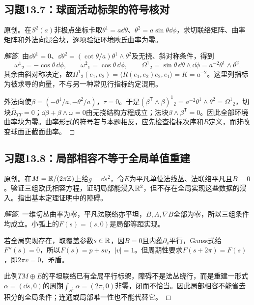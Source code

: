 \subsection*{习题13.7：球面活动标架的符号核对}
原创。在$S^2(a)$非极点坐标卡取$\theta^1=a\dd\theta$、$\theta^2=a\sin\theta\dd\phi$，求切联络矩阵、曲率矩阵和外法向混合块，逐项验证环境欧氏曲率为零。
\begin{proof}[解答]
由$\dd\theta^1=0$、$\dd\theta^2=(\cot\theta/a)\theta^1\wedge\theta^2$及无挠、斜对称条件，得到
\[
 \omega^1{}_2=-\cos\theta\,\dd\phi,\qquad
 \omega^2{}_1=\cos\theta\,\dd\phi,\qquad
 \Omega^1{}_2=\sin\theta\,\dd\theta\wedge\dd\phi
             =a^{-2}\theta^1\wedge\theta^2.
\]
其余由斜对称决定，故$\Omega^1{}_2(e_1,e_2)=\langle R(e_1,e_2)e_2,e_1\rangle=K=a^{-2}$。这里列指标为被求导的向量，不与另一种常见行指标约定混用。

外法向使$\beta=(-\theta^1/a,-\theta^2/a)$，$\tau=0$。于是$(\beta^{\mathsf T}\wedge\beta)^1{}_2=a^{-2}\theta^1\wedge\theta^2=\Omega^1{}_2$，切块$\bar\Omega_{TT}=0$；$\dd\beta+\beta\wedge\omega=0$由无挠结构方程成立；法块$\beta\wedge\beta^{\mathsf T}=0$。因此全部环境曲率块为零。曲率形式的符号若与本题相反，应先检查指标次序和$R$定义，而非改变球面正截面曲率。
\end{proof}

\subsection*{习题13.8：局部相容不等于全局单值重建}
原创。在$M=\mathbb{R}/(2\pi\mathbb Z)$上给$g=\dd s^2$，令$E$为平凡单位法线丛、法联络平凡且$B=0$。验证三组欧氏相容方程，证明局部能浸入$\mathbb{R}^2$，但不存在全局实现这些数据的浸入。指出基本定理证明中的障碍。
\begin{proof}[解答]
一维切丛曲率为零，平凡法联络亦平坦，$B,A,\nabla B$全部为零，所以三组条件均成立。小弧上的$F(s)=(s,0)$是局部等距实现。

若全局实现存在，取覆盖参数$s\in\mathbb{R}$，因$B=0$且内蕴$\partial_s$平行，Gauss式给$F''(s)=0$，所以$F(s)=p+sv$，$|v|=1$。但周期性要求$F(s+2\pi)=F(s)$，即$2\pi v=0$，矛盾。

此例$TM\oplus E$的平坦联络已有全局平行标架，障碍不是法丛绕行，而是重建一形式$\alpha=(\dd s,0)$的周期$\int_{S^1}\alpha=(2\pi,0)$非零，闭而不恰当。因此局部相容不能省去积分的全局条件；连通或局部唯一性也不能代替它。
\end{proof}
